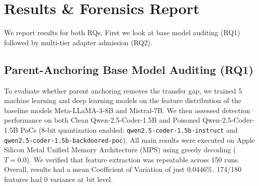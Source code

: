 \section{Results \& Forensics Report}
\label{sec:experiments}

We report results for both RQs. First we look at base model auditing (RQ1) followed by multi-tier adapter admission (RQ2).

\subsection{Parent-Anchoring Base Model Auditing (RQ1)}
\label{subsec:exp_rq1}

To evaluate whether parent anchoring removes the transfer gap, we trained 5 machine learning and deep learning models on the feature distribution of the baseline models Meta-LLaMA-3-8B and Mistral-7B. We then assessed detection performance on both Clean Qwen-2.5-Coder-1.5B and Poisoned Qwen-2.5-Coder-1.5B PoCs (8-bit quantization enabled: \nolinkurl{qwen2.5-coder-1.5b-instruct} and \nolinkurl{qwen2.5-coder-1.5b-backdoored-poc}). All main results were executed on Apple Silicon Metal Unified Memory Architecture (MPS) using greedy decoding ($T = 0.0$). We verified that feature extraction was repeatable across 150 runs. Overall, results had a mean Coefficient of Variation of just 0.0446\%. 174/180 features had 0 variance at bit level.

